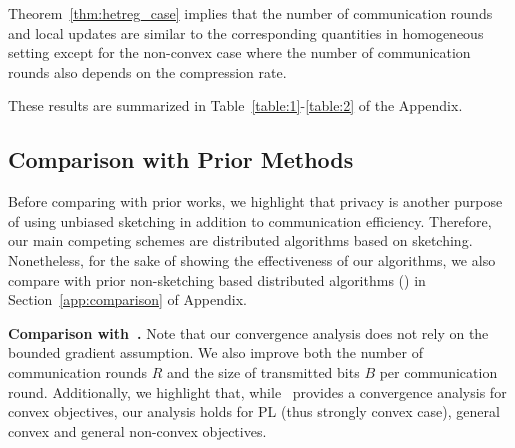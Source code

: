 \documentclass[11pt]{article}
\begin{document}
Theorem~\ref{thm:hetreg_case} implies that the number of communication rounds and local updates are similar to the corresponding quantities in homogeneous setting except for the non-convex case where the number of communication rounds also depends on the compression rate.

These results are summarized in Table~\ref{table:1}-\ref{table:2} of the Appendix.


\vspace{-0.05in}
\subsection{Comparison with Prior Methods} 

Before comparing with prior works, we highlight that privacy is another purpose of using unbiased sketching in addition to communication efficiency. 
Therefore, our main competing schemes are distributed algorithms based on sketching. 
Nonetheless, for the sake of showing the effectiveness of our algorithms, we also compare with prior non-sketching based distributed algorithms (\cite{karimireddy2019scaffold,basu2019qsparse,reisizadeh2020fedpaq,haddadpour2020federated}) in Section~\ref{app:comparison} of Appendix.


\noindent\textbf{Comparison with~\citet{li2019privacy}.} Note that our convergence analysis does not rely on the bounded gradient assumption. We also improve both the number of communication rounds $R$ and the size of transmitted bits $B$ per communication round. 
Additionally, we highlight that, while~\citep{li2019privacy} provides a convergence analysis for convex objectives, our analysis holds for PL (thus strongly convex case), general convex and general non-convex objectives.
\end{document}
